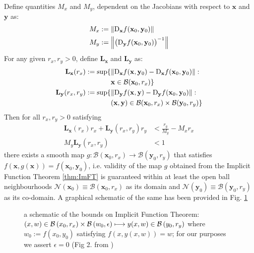 \documentclass[letterpaper, 10 pt, conference, dvipsnames]{ieeeconf}
\begin{document}
\thm\label{thm:imftbounds} Define quantities \(M_x\) and \(M_y\), dependent on the Jacobians with respect to \(\mathbf{x}\) and \(\mathbf{y}\) as:
\begin{align}
    M_x & := \norm{\mathrm{D}_{\mathbf{x}}f(\mathbf{x}_0,\mathbf{y}_0)} \label{def:M_x}                \\
    M_y & := \norm{\big(\mathrm{D}_{\mathbf{y}}f(\mathbf{x}_0,\mathbf{y}_0)\big)^{-1}} \label{def:M_y}
\end{align}
For any given \(r_x,r_y>0\), define \(\mathbf{L}_\mathbf{x}\) and \(\mathbf{L}_\mathbf{y}\) as:
\begin{align}
    \mathbf{L}_\mathbf{x}(r_x) := \sup\{     & \norm{\mathrm{D}_\mathbf{x}f(\mathbf{x},\mathbf{y}_0)-\mathrm{D}_\mathbf{x}f(\mathbf{x}_0,\mathbf{y}_0)}:   \notag \\
                                             & \mathbf{x}\in\mathcal{B}(\mathbf{x}_0,r_x)\}                                                 \label{def:L_x}       \\
    \mathbf{L}_\mathbf{y}(r_x,r_y) := \sup\{ & \norm{\mathrm{D}_\mathbf{y}f(\mathbf{x},\mathbf{y})-\mathrm{D}_\mathbf{y}f(\mathbf{x}_0,\mathbf{y}_0)}: \notag     \\
                                             & (\mathbf{x},\mathbf{y})\in\mathcal{B}(\mathbf{x}_0,r_x)\times\mathcal{B}(\mathbf{y}_0,r_y)\} \label{def:L_y}
\end{align}
Then for all \(r_x,r_y>0\) satisfying
\begin{align}
    \mathbf{L}_\mathbf{x}(r_x)r_x+\mathbf{L}_\mathbf{y}(r_x,r_y)r_y & < \frac{r_y}{M_y}-M_xr_x \label{eq:1} \\
    M_y\mathbf{L}_\mathbf{y}(r_x,r_y)                               & < 1                      \label{eq:2}
\end{align}
there exists a smooth map \(g:\mathcal{B}(\mathbf{x}_0,r_x)\to\mathcal{B}(\mathbf{y}_0,r_y)\) that satisfies \(f(\mathbf{x},g(\mathbf{x})) = f(\mathbf{x}_0,\mathbf{y}_0)\), i.e. validity of the map \(g\) obtained from the Implicit Function Theorem \ref{thm:ImFT} is guaranteed within at least the open ball neighbourhoods \({\mathcal{N}}(\mathbf{x}_0)\equiv\mathcal{B}(\mathbf{x}_0,r_x)\) as its domain and \({\mathcal{N}}(\mathbf{y}_0)\equiv\mathcal{B}(\mathbf{y}_0,r_y)\) as its co-domain. A graphical schematic of the same has been provided in Fig. \ref{fig:ImFT}

\begin{figure}[ht!]
    \centering
    
    \caption{a schematic of the bounds on Implicit Function Theorem: \((x,w)\in\mathcal{B}_{}\left(x_0,r_x\right)\times\mathcal{B}_{}\left(w_0,\epsilon\right)\longmapsto y(x,w)\in\mathcal{B}_{}\left(y_0,r_y\right)\) where \(w_0 := f(x_0,y_0)\) satisfying \(f(x,y(x,w)) = w\); for our purposes we assert \(\epsilon=0\) (Fig 2. from \cite{jindal2023fdbklin}) \label{fig:ImFT}}
    \vspace{-6mm}
\end{figure}
\end{document}
